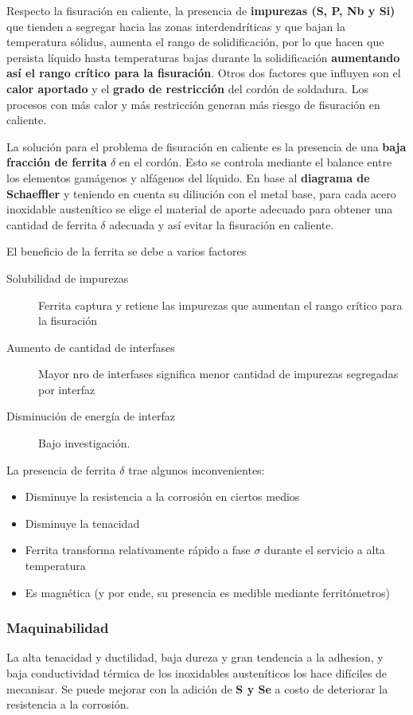 Respecto la fisuración en caliente, la presencia de \textbf{impurezas (S, P, Nb y Si)} que tienden a segregar hacia las zonas interdendríticas y que bajan la temperatura sólidus, aumenta el rango de solidificación, por lo que hacen que persista líquido hasta temperaturas bajas durante la solidificación \textbf{aumentando así el rango crítico para la fisuración}. Otros dos factores que influyen son el \textbf{calor aportado} y el \textbf{grado de restricción} del cordón de soldadura. Los procesos con más calor y más restricción generan más riesgo de fisuración en caliente.

La solución para el problema de fisuración en caliente es la presencia de una \textbf{baja fracción de ferrita} $\delta$ en el cordón. Esto se controla mediante el balance entre los elementos gamágenos y alfágenos del líquido. En base al \textbf{diagrama de Schaeffler} y teniendo en cuenta su diliución con el metal base, para cada acero inoxidable austenítico se elige el material de aporte adecuado para obtener una cantidad de ferrita $\delta$ adecuada y así evitar la fisuración en caliente.

El beneficio de la ferrita se debe a varios factores

\begin{description}
	\item[Solubilidad de impurezas] Ferrita captura y retiene las impurezas que aumentan el rango crítico para la fisuración
	\item[Aumento de cantidad de interfases] Mayor nro de interfases significa menor cantidad de impurezas segregadas por interfaz
	\item[Disminución de energía de interfaz] Bajo investigación.  
\end{description}

La presencia de ferrita $\delta$ trae algunos inconvenientes:
\begin{itemize}
	\item Disminuye la resistencia a la corrosión en ciertos medios
	\item Disminuye la tenacidad
	\item Ferrita transforma relativamente rápido a fase $\sigma$ durante el servicio a alta temperatura
	\item Es magnética (y por ende, su presencia es medible mediante ferritómetros)
\end{itemize}

\subsubsection{Maquinabilidad}
La alta tenacidad y ductilidad, baja dureza y gran tendencia a la adhesion, y baja conductividad térmica de los inoxidables austeníticos los hace difíciles de mecanisar. Se puede mejorar con la adición de \textbf{S y Se} a costo de  deteriorar la resistencia a la corrosión.

